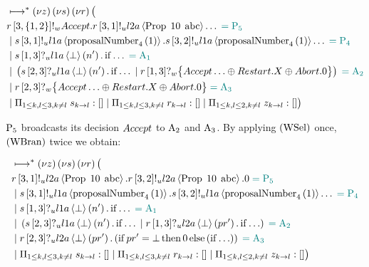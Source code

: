 \begin{align*}
&\longmapsto^* \left(\nu z\right)\left(\nu s\right)\left(\nu r\right) \big (\\
&r\left[3, \left\{1, 2\right\}\right]!_w \mathnormal{Accept}.r\left[3, 1\right]!_u l2a \left\langle \operatorname{Prop}\; 10\; \operatorname{abc} \right\rangle\ldots \;\textcolor{teal}{= \operatorname{P_{5}}}\\
&\; | \; s\left[3, 1\right]!_u l1a \left\langle \operatorname{proposalNumber}_4\left( 1\right) \right\rangle.s\left[3, 2\right]!_u l1a \left\langle \operatorname{proposalNumber}_4\left( 1\right) \right\rangle\ldots \;\textcolor{teal}{= \operatorname{P_{4}}}\\
&\; | \; s\left[1, 3\right]?_u l1a \left\langle \bot \right\rangle \left(n'\right).\operatorname{if} \ldots \;\textcolor{teal}{= \operatorname{A_{1}}}\\
&\; | \; \left(
    s\left[2, 3\right]?_u l1a \left\langle \bot \right\rangle \left(n'\right).\operatorname{if} \ldots
    \; | \; r\left[1, 3\right]?_w \big\{\mathnormal{Accept} \ldots \oplus \mathnormal{Restart} .X \oplus \mathnormal{Abort} . 0\big\}
\right) \;\textcolor{teal}{= \operatorname{A_{2}}}\\
&\; | \; r\left[2, 3\right]?_w \big\{\mathnormal{Accept} \ldots \oplus \mathnormal{Restart} .X \oplus \mathnormal{Abort} . 0\big\} \;\textcolor{teal}{= \operatorname{A_{3}}}\\
&\; | \; \Pi_{1 \le k,l \le 3, k \neq l}\; s_{k\to l}:[]
\; | \; \Pi_{1 \le k,l \le 3, k \neq l}\; r_{k\to l}:[]
\; | \; \Pi_{1 \le k,l \le 2, k \neq l}\; z_{k\to l}:[]
\big )
\end{align*}

$\operatorname{P_{5}}$ broadcasts its decision $\mathnormal{Accept}$ to $\operatorname{A_{2}}$ and $\operatorname{A_{3}}$.
By applying $\left(\operatorname{WSel}\right)$ once, $\left(\operatorname{WBran}\right)$ twice we obtain:

\begin{align*}
&\mapstostar \NuChannels \big (\\
&
    \SendUnreliableP{\ChannelR}{3}{1}{\LTwoA}{\ProposalC{10}{\ABC}}.
    \SendUnreliableP{\ChannelR}{3}{2}{\LTwoA}{\ProposalC{10}{\ABC}}.
    \End
    \comment{= \Proposer{5}}\\
&\Or
    \SendUnreliableP{\ChannelS}{3}{1}{\LOneA}{\proposalNumber{1}{4}}.
    \SendUnreliableP{\ChannelS}{3}{2}{\LOneA}{\proposalNumber{1}{4}}\ldots
    \comment{= \Proposer{4}}\\
&\Or \ReceiveUnreliableP{\ChannelS}{1}{3}{\LOneA}{\bot}{n'}.\If{\ldots} \comment{= \Acceptor{1}}\\
&\Or \Paren{
    \ReceiveUnreliableP{\ChannelS}{2}{3}{\LOneA}{\bot}{n'}.\If{\ldots}
    \Or \ReceiveUnreliableP{\ChannelR}{1}{3}{\LTwoA}{\bot}{pr'}.\If{\ldots}
} \comment{= \Acceptor{2}}\\
&\Or
    \ReceiveUnreliableP{\ChannelR}{2}{3}{\LTwoA}{\bot}{pr'}.
    \Paren{
        \If{pr' = \bot}
        \Then{\End}
        \Else{
            \Paren{
                \If{\ldots}
            }
        }
    }
    \comment{= \Acceptor{3}}\\
&\Or \InnerSessionQueues{\ChannelS}
\Or \InnerSessionQueues{\ChannelR}
\Or \OuterSessionQueues
\big )
\end{align*}

